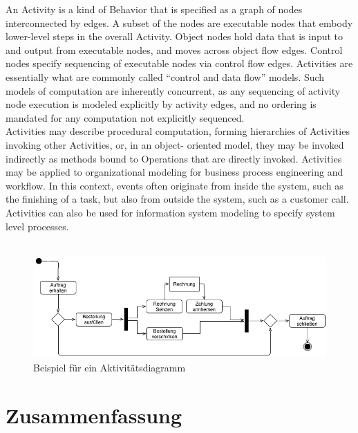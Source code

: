 \glqq An Activity is a kind of Behavior that is specified as a graph of nodes interconnected by edges. A subset of the nodes are executable nodes that embody lower-level steps in the overall Activity. Object nodes hold data that is input to and output from executable nodes, and moves across object flow edges. Control nodes specify sequencing of executable nodes via control flow edges. Activities are essentially what are commonly called “control and data flow” models. Such models of computation are inherently concurrent, as any sequencing of activity node execution is modeled explicitly by activity edges, and no ordering is mandated for any computation not explicitly sequenced.\\
Activities may describe procedural computation, forming hierarchies of Activities invoking other Activities, or, in an object- oriented model, they may be invoked indirectly as methods bound to Operations that are directly invoked. Activities may be applied to organizational modeling for business process engineering and workflow. In this context, events often originate from inside the system, such as the finishing of a task, but also from outside the system, such as a customer call. Activities can also be used for information system modeling to specify system level processes.\grqq \cite{UML_def}\\
\\

\begin{figure}[hbt!]
 \centering
  \includegraphics[width=1\textwidth]{graphics/stateoftheart/Activity_bsp}
  \caption{Beispiel für ein Aktivitätsdiagramm \cite{activity_example}}
\end{figure}
 
\clearpage
\section{Zusammenfassung}

